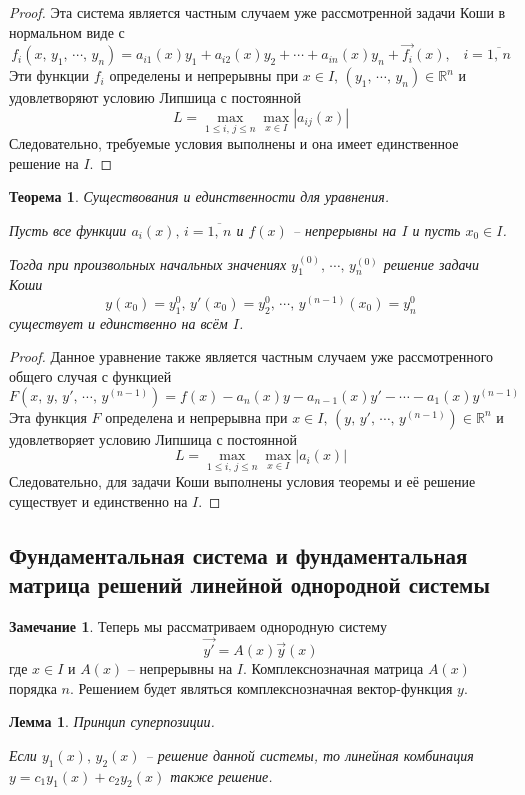 \documentclass[a4paper,12pt]{article}
\renewcommand{\leq}{\ensuremath{\leqslant}}
\theoremstyle{plain}
\newtheorem{theorem}{Теорема}[section]
\newtheorem{lemma}{Лемма}[section]
\theoremstyle{definition}
\newtheorem*{note}{Замечание}
\theoremstyle{remark}
\begin{document}
\begin{proof}
	Эта система является частным случаем уже рассмотренной задачи Коши в нормальном виде с
	\[f_i(x,\, y_1,\,\cdots,\,y_n) = a_{i1}(x)y_1 + a_{i2}(x)y_2+\cdots+a_{in}(x)y_n + \vec{f_i}(x),\;\;\; i = \overline{1,\,n}\]
	Эти функции $f_i$ определены и непрерывны при $x \in I,\, (y_1,\,\cdots,\,y_n)\in \mathbb{R}^n$ и удовлетворяют условию Липшица с постоянной
	\[L = \max_{1\leq i,\,j \leq n}\max_{x \in I}|a_{ij}(x)|\]
	Следовательно, требуемые условия выполнены и она имеет единственное решение на $I$.
\end{proof}

\begin{theorem}
	Существования и единственности для уравнения.

	Пусть все функции $a_i(x),\, i = \overline{1,\,n}$ и $f(x)$ -- непрерывны на $I$ и пусть $x_0 \in I$.

	Тогда при произвольных начальных значениях $y_1^{(0)},\, \cdots,\, y_n^{(0)}$ решение задачи Коши
	\[y(x_0) = y_1^0,\, y'(x_0) = y_2^0,\,\cdots,\,y^{(n-1)}(x_0) = y_n^0\]
	существует и единственно на всём $I$.
\end{theorem}

\begin{proof}
	Данное уравнение также является частным случаем уже рассмотренного общего случая с функцией
	\[F(x,\,y,\,y',\,\cdots,\,y^{(n-1)}) = f(x) - a_n(x)y - a_{n-1}(x)y' - \cdots - a_1(x)y^{(n-1)}\]
	Эта функция $F$ определена и непрерывна при $x \in I,\, (y,\, y',\,\cdots,\,y^{(n-1)})\in\mathbb{R}^n$ и удовлетворяет условию Липшица с постоянной
	\[L = \max_{1\leq i,\,j\leq n}\max_{x \in I} |a_i(x)|\]
	Следовательно, для задачи Коши выполнены условия теоремы и её решение существует и единственно на $I$.
\end{proof}

\subsection{Фундаментальная система и фундаментальная матрица решений линейной однородной системы}
\begin{note}
	Теперь мы рассматриваем однородную систему
	\[\vec{y'} = A(x)\vec{y}(x)\]
	где $x \in I$ и $A(x)$ -- непрерывны на $I$. Комплекснозначная матрица $A(x)$ порядка $n$. Решением будет являться комплекснозначная вектор-функция $y$.
\end{note}

\begin{lemma}
	Принцип суперпозиции.

	Если $y_1(x),\, y_2(x)$ -- решение данной системы, то линейная комбинация $y = c_1y_1(x) + c_2y_2(x)$ также решение.
\end{lemma}
\end{document}
